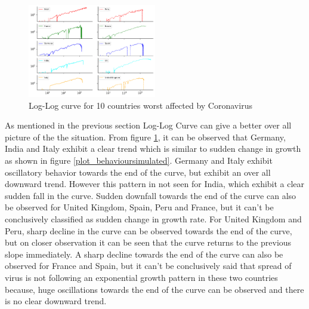 \documentclass[12pt, twosided]{report}  %
\begin{document}
\begin{figure}[H]
	\centering
	\includegraphics[width=0.5\textwidth]{./images/plot_9.pdf}
	\caption{Log-Log curve for 10 countries worst affected by Coronavirus}
	\label{plot_loglogactual}
\end{figure} 

As mentioned in the previous section Log-Log Curve can give a better over all picture of the the situation. From figure \ref{plot_loglogactual}, it can be observed that Germany, India and Italy exhibit a clear trend which is similar to sudden change in growth as shown in figure \ref{plot_behavioursimulated}. Germany and Italy exhibit oscillatory behavior towards the end of the curve, but exhibit an over all downward trend. However this pattern in not seen for India, which exhibit a clear sudden fall in the curve. Sudden downfall towards the end of the curve can also be observed for United Kingdom, Spain, Peru and France, but it can't be conclusively classified as sudden change in growth rate. For United Kingdom and Peru, sharp decline in the curve can be observed towards the end of the curve, but on closer observation it can be seen that the curve returns to the previous slope immediately. A sharp decline towards the end of the curve can also be observed for France and Spain, but it can't be conclusively said that spread of virus is not following an exponential growth pattern in these two countries because, huge oscillations towards the end of the curve can be observed and there is no clear downward trend.
\end{document}
